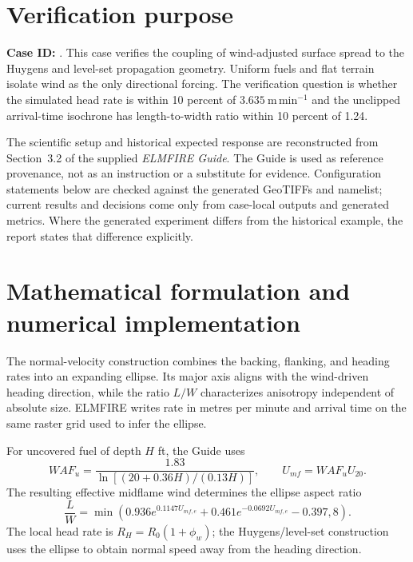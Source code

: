 \section{Verification purpose}

\textbf{Case ID:} \texttt{\CaseID}. This case verifies the coupling of wind-adjusted surface spread to the Huygens and level-set propagation geometry.  Uniform fuels and flat terrain isolate wind as the only directional forcing.  The verification question is whether the simulated head rate is within 10 percent of \(3.635~\mathrm{m\,min^{-1}}\) and the unclipped arrival-time isochrone has length-to-width ratio within 10 percent of 1.24.

The scientific setup and historical expected response are reconstructed from Section~3.2 of the supplied \emph{ELMFIRE Guide}. The Guide is used as reference provenance, not as an instruction or a substitute for evidence. Configuration statements below are checked against the generated GeoTIFFs and namelist; current results and decisions come only from case-local outputs and generated metrics. Where the generated experiment differs from the historical example, the report states that difference explicitly.

\section{Mathematical formulation and numerical implementation}

The normal-velocity construction combines the backing, flanking, and heading rates into an expanding ellipse.  Its major axis aligns with the wind-driven heading direction, while the ratio \(L/W\) characterizes anisotropy independent of absolute size.  ELMFIRE writes rate in metres per minute and arrival time on the same raster grid used to infer the ellipse.

For uncovered fuel of depth \(H\) ft, the Guide uses
\begin{equation}
WAF_u=\frac{1.83}{\ln[(20+0.36H)/(0.13H)]}, \qquad U_{mf}=WAF_uU_{20}.
\end{equation}
The resulting effective midflame wind determines the ellipse aspect ratio
\begin{equation}
\frac{L}{W}=\min\left(0.936e^{0.1147U_{mf,e}}+0.461e^{-0.0692U_{mf,e}}-0.397,8\right).
\end{equation}
The local head rate is \(R_H=R_0(1+\phi_w)\); the Huygens/level-set construction uses the ellipse to obtain normal speed away from the heading direction.


